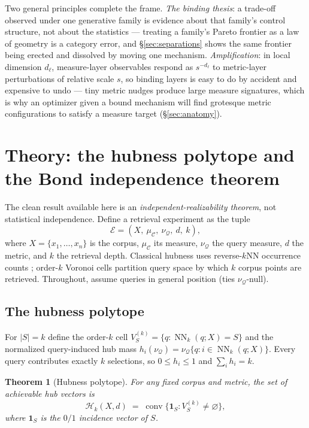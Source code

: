 \documentclass[11pt]{article}
\newcommand{\muC}{\mu_{\mathcal{C}}}
\newcommand{\nuQ}{\nu_{\mathcal{Q}}}
\newcommand{\NN}{\operatorname{NN}}
\newcommand{\conv}{\operatorname{conv}}
\newtheorem{theorem}{Theorem}
\begin{document}
Two general principles complete the frame. \emph{The binding thesis}: a
trade-off observed under one generative family is evidence about that
family's control structure, not about the statistics --- treating a family's
Pareto frontier as a law of geometry is a category error, and
\S\ref{sec:separations} shows the same frontier being erected and dissolved
by moving one mechanism. \emph{Amplification}: in local dimension
$d_{\ell}$, measure-layer observables respond as $s^{-d_{\ell}}$ to
metric-layer perturbations of relative scale $s$, so binding layers is easy
to do by accident and expensive to undo --- tiny metric nudges produce large
measure signatures, which is why an optimizer given a bound mechanism will
find grotesque metric configurations to satisfy a measure target
(\S\ref{sec:anatomy}).

\section{Theory: the hubness polytope and the Bond independence theorem}
\label{sec:theory}

The clean result available here is an \emph{independent-realizability theorem},
not statistical independence. Define a retrieval experiment as the tuple
\[
\mathcal{E} = (X,\ \muC,\ \nuQ,\ d,\ k),
\]
where $X=\{x_1,\dots,x_n\}$ is the corpus, $\muC$ its measure, $\nuQ$ the query
measure, $d$ the metric, and $k$ the retrieval depth. Classical hubness uses
reverse-$k$NN occurrence counts \cite{radovanovic10}; order-$k$ Voronoi cells
partition query space by which $k$ corpus points are retrieved. Throughout,
assume queries in general position (ties $\nuQ$-null).

\subsection{The hubness polytope}

For $|S|=k$ define the order-$k$ cell
$V^{(k)}_S = \{q : \NN_k(q;X) = S\}$ and the normalized query-induced hub mass
$h_i(\nuQ) = \nuQ\{q : i \in \NN_k(q;X)\}$. Every query contributes exactly $k$
selections, so $0 \le h_i \le 1$ and $\sum_i h_i = k$.

\begin{theorem}[Hubness polytope]\label{thm:polytope}
For any fixed corpus and metric, the set of achievable hub vectors is
\[
\mathcal{H}_k(X,d) \;=\; \conv\bigl\{\mathbf{1}_S : V^{(k)}_S \neq \varnothing\bigr\},
\]
where $\mathbf{1}_S$ is the $0/1$ incidence vector of $S$.
\end{theorem}
\end{document}
